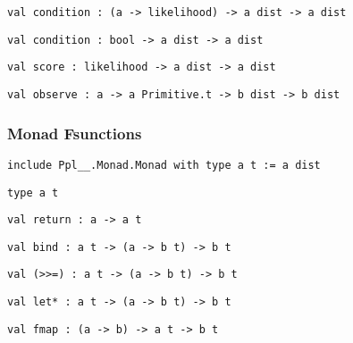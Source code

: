 \protect\hyperlink{val-conditionux27}{}\texttt{val\ condition\textquotesingle{}\ :\ (\textquotesingle{}a\ -\textgreater{}\ likelihood)\ -\textgreater{}\ \textquotesingle{}a\ dist\ -\textgreater{}\ \textquotesingle{}a\ dist}

\protect\hyperlink{val-condition}{}\texttt{val\ condition\ :\ bool\ -\textgreater{}\ \textquotesingle{}a\ dist\ -\textgreater{}\ \textquotesingle{}a\ dist}

\protect\hyperlink{val-score}{}\texttt{val\ score\ :\ likelihood\ -\textgreater{}\ \textquotesingle{}a\ dist\ -\textgreater{}\ \textquotesingle{}a\ dist}

\protect\hyperlink{val-observe}{}\texttt{val\ observe\ :\ \textquotesingle{}a\ -\textgreater{}\ \textquotesingle{}a\ Primitive.t\ -\textgreater{}\ \textquotesingle{}b\ dist\ -\textgreater{}\ \textquotesingle{}b\ dist}

\hypertarget{distux5fmonad}{\subsubsection{\texorpdfstring{\protect\hyperlink{distux5fmonad}{}Monad
Fsunctions}{Monad Fsunctions}}\label{distux5fmonad}}

{\texttt{include\ Ppl\_\_.Monad.Monad\ with\ type\ \textquotesingle{}a\ t\ :=\ \textquotesingle{}a\ dist}}

\protect\hyperlink{type-t}{}\texttt{type\ \textquotesingle{}a\ t}

\protect\hyperlink{val-return}{}\texttt{val\ return\ :\ \textquotesingle{}a\ -\textgreater{}\ \textquotesingle{}a\ t}

\protect\hyperlink{val-bind}{}\texttt{val\ bind\ :\ \textquotesingle{}a\ t\ -\textgreater{}\ (\textquotesingle{}a\ -\textgreater{}\ \textquotesingle{}b\ t)\ -\textgreater{}\ \textquotesingle{}b\ t}

\protect\hyperlink{val-ux28ux5cux253Eux5cux253E=ux29}{}\texttt{val\ (\textgreater{}\textgreater{}=)\ :\ \textquotesingle{}a\ t\ -\textgreater{}\ (\textquotesingle{}a\ -\textgreater{}\ \textquotesingle{}b\ t)\ -\textgreater{}\ \textquotesingle{}b\ t}

\protect\hyperlink{val-letux2a}{}\texttt{val\ let*\ :\ \textquotesingle{}a\ t\ -\textgreater{}\ (\textquotesingle{}a\ -\textgreater{}\ \textquotesingle{}b\ t)\ -\textgreater{}\ \textquotesingle{}b\ t}

\protect\hyperlink{val-fmap}{}\texttt{val\ fmap\ :\ (\textquotesingle{}a\ -\textgreater{}\ \textquotesingle{}b)\ -\textgreater{}\ \textquotesingle{}a\ t\ -\textgreater{}\ \textquotesingle{}b\ t}

